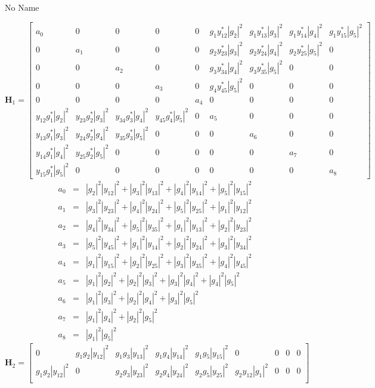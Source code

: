 \documentclass[a4paper,10pt]{article}
\begin{document}
\begin{section}{No Name}
\begin{landscape}
\begin{equation}
\boldsymbol{H}_1 = 
\begin{bmatrix}
a_{0}&0&0&0&0&g_1y_{12}^*|g_2|^2&g_1y_{13}^*|g_3|^2&g_1y_{14}^*|g_4|^2&g_1y_{15}^*|g_5|^2\\
0&a_{1}&0&0&0&g_2y_{23}^*|g_3|^2&g_2y_{24}^*|g_4|^2&g_2y_{25}^*|g_5|^2&0\\
0&0&a_{2}&0&0&g_3y_{34}^*|g_4|^2&g_3y_{35}^*|g_5|^2&0&0\\
0&0&0&a_{3}&0&g_4y_{45}^*|g_5|^2&0&0&0\\
0&0&0&0&a_{4}&0&0&0&0\\
y_{12}g_1^*|g_2|^2&y_{23}g_2^*|g_3|^2&y_{34}g_3^*|g_4|^2&y_{45}g_4^*|g_5|^2&0&a_{5}&0&0&0\\
y_{13}g_1^*|g_3|^2&y_{24}g_2^*|g_4|^2&y_{35}g_3^*|g_5|^2&0&0&0&a_{6}&0&0\\
y_{14}g_1^*|g_4|^2&y_{25}g_2^*|g_5|^2&0&0&0&0&0&a_{7}&0\\
y_{15}g_1^*|g_5|^2&0&0&0&0&0&0&0&a_{8}
\end{bmatrix}
\end{equation}
\begin{eqnarray}
a_{0} &=& |g_2|^2|y_{12}|^2 + |g_3|^2|y_{13}|^2 + |g_4|^2|y_{14}|^2 + |g_5|^2|y_{15}|^2\\
a_{1} &=& |g_3|^2|y_{23}|^2 + |g_4|^2|y_{24}|^2 + |g_5|^2|y_{25}|^2 + |g_1|^2|y_{12}|^2\\
a_{2} &=& |g_4|^2|y_{34}|^2 + |g_5|^2|y_{35}|^2 + |g_1|^2|y_{13}|^2 + |g_2|^2|y_{23}|^2\\
a_{3} &=& |g_5|^2|y_{45}|^2 + |g_1|^2|y_{14}|^2 + |g_2|^2|y_{24}|^2 + |g_3|^2|y_{34}|^2\\
a_{4} &=& |g_1|^2|y_{15}|^2 + |g_2|^2|y_{25}|^2 + |g_3|^2|y_{35}|^2 + |g_4|^2|y_{45}|^2\\
a_{5} &=& |g_1|^2|g_2|^2 + |g_2|^2|g_3|^2 + |g_3|^2|g_4|^2 + |g_4|^2|g_5|^2\\
a_{6} &=& |g_1|^2|g_3|^2 + |g_2|^2|g_4|^2 + |g_3|^2|g_5|^2\\
a_{7} &=& |g_1|^2|g_4|^2 + |g_2|^2|g_5|^2\\
a_{8} &=& |g_1|^2|g_5|^2
\end{eqnarray}
\begin{equation}
\boldsymbol{H}_2 = 
\begin{bmatrix}
0&g_1g_2|y_{12}|^2&g_1g_3|y_{13}|^2&g_1g_4|y_{14}|^2&g_1g_5|y_{15}|^2&0&0&0&0\\
g_1g_2|y_{12}|^2&0&g_2g_3|y_{23}|^2&g_2g_4|y_{24}|^2&g_2g_5|y_{25}|^2&g_2y_{12}|g_1|^2&0&0&0\\

\end{bmatrix}
\end{equation}
\end{landscape}
\end{section}
\end{document}
